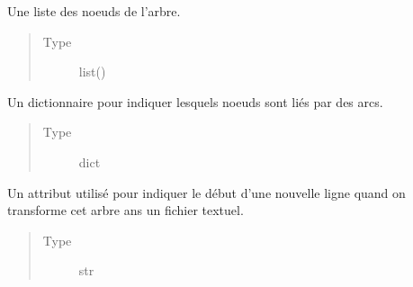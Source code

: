 \documentclass[letterpaper,10pt,french]{sphinxmanual}
\begin{document}
\begin{fulllineitems}
\begin{fulllineitems}
\begin{quote}
\begin{description}
\end{description}\end{quote}

\end{fulllineitems}


\begin{fulllineitems}
\label{\detokenize{index:StrategyTree.StrategyTree._nodes}}
Une liste des noeuds de l’arbre.
\begin{quote}\begin{description}
\item[{Type}] \leavevmode
list({\hyperref[\detokenize{index:StrategyTree.NodeST}]{}})

\end{description}\end{quote}

\end{fulllineitems}


\begin{fulllineitems}
\label{\detokenize{index:StrategyTree.StrategyTree._adj_dict}}
Un dictionnaire pour indiquer lesquels noeuds sont liés par des arcs.
\begin{quote}\begin{description}
\item[{Type}] \leavevmode
dict

\end{description}\end{quote}

\end{fulllineitems}


\begin{fulllineitems}
\label{\detokenize{index:StrategyTree.StrategyTree.fout_newline}}
Un attribut utilisé pour indiquer le début d’une nouvelle ligne quand on transforme cet arbre ans un fichier
textuel.
\begin{quote}\begin{description}
\item[{Type}] \leavevmode
str


\end{description}
\end{quote}
\end{fulllineitems}
\end{fulllineitems}
\end{document}
